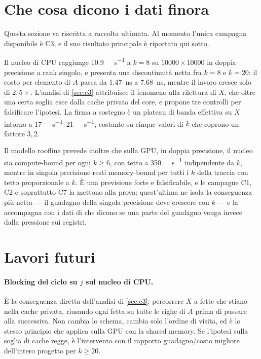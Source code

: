 \section{Che cosa dicono i dati finora}

\begin{daverificare}
Questa sezione va riscritta a raccolta ultimata. Al momento l'unica campagna
disponibile \`e C3, e il suo risultato principale \`e riportato qui sotto.
\end{daverificare}

Il nucleo di CPU raggiunge \SI{10.9}{\giga\flop\per\second} a $k = 8$ su
$\num{10000}\times\num{10000}$ in doppia precisione a rank singolo, e presenta
una discontinuit\`a netta fra $k = 8$ e $k = 20$: il costo per elemento di $A$
passa da \SI{1.47}{\nano\second} a \SI{7.68}{\nano\second}, mentre il lavoro
cresce solo di $2{,}5\times$. L'analisi di \cref{sec:c3} attribuisce il
fenomeno alla rilettura di $X$, che oltre una certa soglia esce dalla cache
privata del core, e propone tre controlli per falsificare l'ipotesi. La firma a
sostegno \`e un plateau di banda effettiva su $X$ intorno a
\SIrange{17}{21}{\giga\byte\per\second}, costante su cinque valori di $k$ che
coprono un fattore $3{,}2$.

Il modello roofline prevede inoltre che sulla GPU, in doppia precisione, il
nucleo sia compute-bound per ogni $k \ge 6$, con tetto a
\SI{350}{\giga\flop\per\second} indipendente da $k$, mentre in singola
precisione resti memory-bound per tutti i $k$ della traccia con tetto
proporzionale a $k$. \`E una previsione forte e falsificabile, e le campagne C1,
C2 e soprattutto C7 la mettono alla prova: quest'ultima ne isola la conseguenza
pi\`u netta --- il guadagno della singola precisione deve crescere con $k$ --- e
la accompagna con i dati di  che dicono se una parte del guadagno
venga invece dalla pressione sui registri.

\section{Lavori futuri}
\label{sec:lavori-futuri}

\paragraph{Blocking del ciclo su $j$ sul nucleo di CPU.} \`E la conseguenza
diretta dell'analisi di \cref{sec:c3}: percorrere $X$ a fette che stiano nella
cache privata, riusando ogni fetta su tutte le righe di $A$ prima di passare alla
successiva. Non cambia lo schema, cambia solo l'ordine di visita, ed \`e lo stesso
principio che  applica sulla GPU con la shared
memory. Se l'ipotesi sulla soglia di cache regge, \`e l'intervento con il
rapporto guadagno/costo migliore dell'intero progetto per $k \ge 20$.

